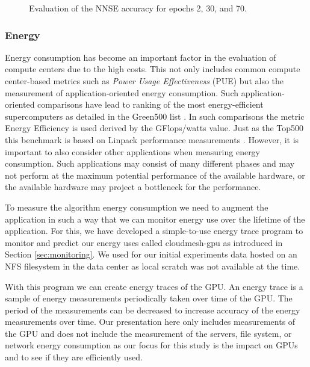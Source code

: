 \documentclass[utf8]{FrontiersinVancouver} %
\begin{document}
\begin{figure}[p]
\begin{center}
  \end{center}

  \caption {Evaluation of the NNSE accuracy for epochs 2, 30, and 70.}
  \label{fig:NNSE-comparison-a100}

\end{figure}




\subsubsection{Energy}
\label{sec:perf-energy}


Energy consumption has become an important factor in the evaluation of
compute centers due to the high costs. This not only includes common
compute center-based metrics such as {\em Power Usage Effectiveness} (PUE) 
but also the measurement of application-oriented energy consumption. 
Such application-oriented comparisons have lead to ranking of the most
energy-efficient supercomputers as detailed in the Green500 list
\citep{green500}. In such comparisons the metric Energy Efficiency is used derived by the GFlops/watts value. Just as the Top500 this benchmark is based on Linpack performance measurements \cite{www-top500}.
However, it is important to also consider other applications when measuring energy consumption. Such applications may consist of many different phases and may not perform at the maximum potential performance of the available hardware, or the available hardware may project a bottleneck for the performance. 

To measure the  algorithm energy consumption we need to augment the application in such a way that we can monitor energy use over the lifetime of the application.  
For this, we have developed a simple-to-use energy trace program to monitor and
predict our energy uses called cloudmesh-gpu as introduced in Section \ref{sec:monitoring}.
We used for our initial experiments data hosted on an NFS filesystem in the data center as local scratch was not available at the time.


With this program we can create energy traces of the GPU. An energy trace is a sample of energy measurements periodically taken over time of the GPU. The period of the measurements can be decreased to increase accuracy of the energy measurements over time. Our presentation here only includes measurements of the GPU and does not include the measurement of the servers, file system, or network energy consumption as our focus for this study is the impact on GPUs and to see if they are efficiently used.
\end{document}
